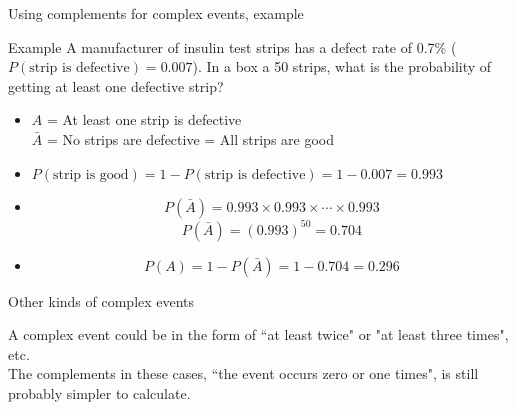 \documentclass[xcolor=table]{beamer}
\begin{document}
\begin{frame}{Using complements for complex events, example}
\begin{exampleblock}{Example}
A manufacturer of insulin test strips has a defect rate of 0.7\% ($P(\text{strip is defective}) = 0.007$). In a box a 50 strips, what is the probability of getting at least one defective strip?
\begin{itemize}
\pause
\item $A$ = At least one strip is defective\\
$\bar A$ = No strips are defective = All strips are good
\pause
\item $P(\text{strip is good}) = 1 - P(\text{strip is defective}) = 1 - 0.007 = 0.993$ 
\pause
\item \[P(\bar A) = 0.993 \times 0.993 \times \cdots \times 0.993\]
\[P(\bar A) = (0.993)^{50} = 0.704\]
\vspace*{-\baselineskip}\pause 
\item \[P(A) = 1 - P(\bar A) = 1 - 0.704 = 0.296\]
\end{itemize}
\end{exampleblock}
\end{frame}

\begin{frame}{Other kinds of complex events}
\begin{block}{}
A complex event could be in the form of ``at least twice" or "at least three times", etc.\\
\medskip
\pause
The complements in these cases, ``the event occurs zero or one times", is still probably simpler to calculate.
\end{block}
\end{frame}
\end{document}
